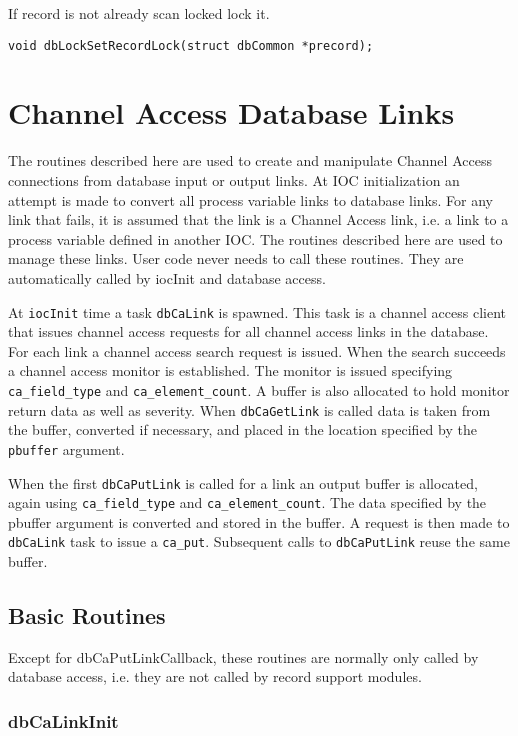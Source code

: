 If record is not already scan locked lock it.

\begin{verbatim}void dbLockSetRecordLock(struct dbCommon *precord);
\end{verbatim}\section{Channel Access Database Links}

The routines described here are used to create and manipulate Channel Access connections from database input or output 
links. At IOC initialization an attempt is made to convert all process variable links to database links. For any link that 
fails, it is assumed that the link is a Channel Access link, i.e. a link to a process variable defined in another IOC. The 
routines described here are used to manage these links. User code never needs to call these routines. They are 
automatically called by iocInit and database access.

At \verb|iocInit| time a task \verb|dbCaLink| is spawned. This task is a channel access client that issues channel access requests 
for all channel access links in the database. For each link a channel access search request is issued. When the search 
succeeds a channel access monitor is established. The monitor is issued specifying \verb|ca_field_type| and 
\verb|ca_element_count|. A buffer is also allocated to hold monitor return data as well as severity. When \verb|dbCaGetLink| is 
called data is taken from the buffer, converted if necessary, and placed in the location specified by the \verb|pbuffer| 
argument.

When the first \verb|dbCaPutLink| is called for a link an output buffer is allocated, again using \verb|ca_field_type| and 
\verb|ca_element_count|. The data specified by the pbuffer argument is converted and stored in the buffer. A request is then 
made to \verb|dbCaLink| task to issue a \verb|ca_put|. Subsequent calls to \verb|dbCaPutLink| reuse the same buffer.

\subsection{Basic Routines}

Except for dbCaPutLinkCallback, these routines are normally only called by database access, i.e. they are not called by 
record support modules.

\subsubsection{dbCaLinkInit}

